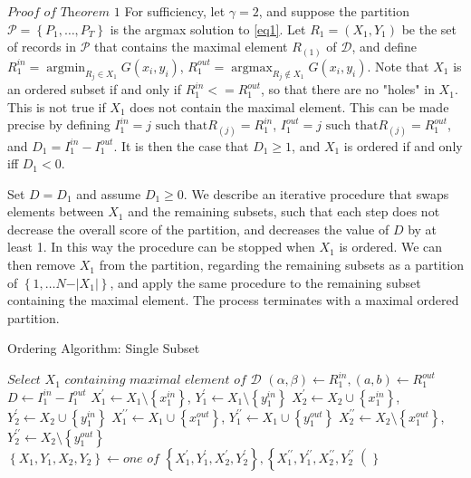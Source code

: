 \documentclass{article}
\theoremstyle{case}
\DeclareMathOperator*{\argmax}{argmax} %
\DeclareMathOperator*{\argmin}{argmin} %
\begin{document}
\vspace{6pt}

$\textit{Proof of Theorem 1}$
For sufficiency, let $\gamma = 2$, and suppose the partition $\mathcal{P} = \left\lbrace P_1, \dots, P_T\right\rbrace$ is the argmax solution to \ref{eq1}. Let $R_1 = (X_1, Y_1)$ be the set of records in $\mathcal{P}$ that contains the maximal element $R_{(1)}$ of $\mathcal{D}$, and define $R_1^{in} = \argmin_{R_j \in X_1} G(x_i, y_i)$, $R_1^{out} = \argmax_{R_j \not\in X_1} G(x_i, y_i)$. Note that $X_1$ is an ordered subset if and only if $R_1^{in} <= R_1^{out}$, so that there are no "holes" in $X_1$. This is not true if $X_1$ does not contain the maximal element. This can be made precise by defining $I_1^{in} = j \text{ such that} R_{(j)} = R_1^{in}$, $I_1^{out} = j \text{ such that} R_{(j)} = R_1^{out}$, and $D_1 = I_1^{in} - I_1^{out}$. It is then the case that $D_1 \geq 1$, and $X_1$ is ordered if and only iff $D_1 < 0$.

Set $D = D_1$ and assume $D_1 \geq 0$. We describe an iterative procedure that swaps elements between $X_1$ and the remaining subsets, such that each step does not decrease the overall score of the partition, and decreases the value of $D$ by at least 1. In this way the procedure can be stopped when $X_1$ is ordered. We can then remove $X_1$ from the partition, regarding the remaining subsets as a partition of $\left\lbrace 1, \dots N-\vert X_1 \vert\right\rbrace$, and apply the same procedure to the remaining subset containing the maximal element. The process terminates with a maximal ordered partition.

\begin{algorithm}
\caption{Ordering Algorithm: Single Subset}
\begin{algorithmic}[1]
\State $\textit{Select } X_1 \textit{ containing maximal element of } \mathcal{D}$
\State $\left( \alpha , \beta \right) \gets R_1^{in}, \left( a,b \right) \gets R_1^{out}$
\State $D \gets I_1^{in} - I_1^{out}$
\State $X_1^\prime \gets X_1\setminus \left\lbrace x_1^{in}\right\rbrace$, $Y_1^{\prime} \gets X_1\setminus \left\lbrace y_1^{in}\right\rbrace$
\State $X_2^{\prime} \gets X_2\cup \left\lbrace x_1^{in}\right\rbrace$, $Y_2^{\prime} \gets X_2\cup \left\lbrace y_1^{in}\right\rbrace$
\EndIf
{}
\State $X_1^{\prime\prime} \gets X_1\cup \left\lbrace x_1^{out}\right\rbrace$, $Y_1^{\prime\prime} \gets X_1\cup \left\lbrace y_1^{out}\right\rbrace$
\State $X_2^{\prime\prime} \gets X_2\setminus \left\lbrace x_1^{out}\right\rbrace$, $Y_2^{\prime\prime} \gets X_2\setminus \left\lbrace y_1^{out}\right\rbrace$
\EndIf
{}
\State $\left\lbrace X_1, Y_1, X_2, Y_2 \right\rbrace \gets \textit{one of } \left\lbrace X_1^{\prime}, Y_1^{\prime}, X_2^{\prime}, Y_2^{\prime}\right\rbrace, \left\lbrace X_1^{\prime\prime}, Y_1^{\prime\prime}, X_2^{\prime\prime}, Y_2^{\prime\prime}\right(\rbrace$
\EndIf
{}
\EndWhile
\end{algorithmic}
\end{algorithm}
\end{document}
